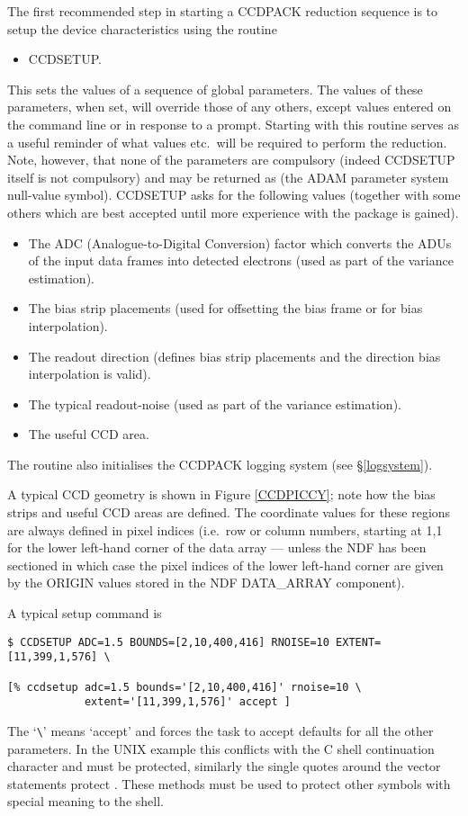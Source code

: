 The first recommended step in starting a CCDPACK reduction sequence is
to setup the device characteristics using the routine
\begin{itemize}
\item CCDSETUP.
\end{itemize}
This sets the values of a sequence of global parameters. The
values of these parameters, when set, will override those of any others,
except values entered on the command line or in response to a prompt.
Starting with this routine serves as a useful reminder of what values
etc.\ will be required to perform the reduction. Note, however, that
none of the parameters are compulsory (indeed CCDSETUP itself is not
compulsory) and may be returned as   (the ADAM parameter
system null-value symbol).  CCDSETUP asks for the following values
(together with some others which are  best accepted until more
experience with the package is gained). 

\begin{itemize}
\item The ADC (Analogue-to-Digital Conversion) factor which converts the
ADUs of the input data frames into detected electrons (used as part of
the variance estimation).
\item The bias strip placements (used for offsetting the bias frame or for
bias interpolation).
\item The readout direction (defines bias strip placements and the direction 
bias interpolation is valid).
\item The typical readout-noise (used as part of the variance
estimation).
\item The useful CCD area.
\end{itemize}
The routine also initialises the CCDPACK logging system (see
\S\ref{logsystem}).

A typical CCD geometry is shown in Figure \ref{CCDPICCY}; note how the
bias strips and useful CCD areas are defined. The coordinate values for
these regions are always defined in pixel indices (i.e.\ row or column
numbers, starting at 1,1 for the lower left-hand corner of the data array
--- unless the NDF has been sectioned in which case the pixel indices of
the lower left-hand corner are given by the ORIGIN values stored in the
NDF DATA\_ARRAY component).

A typical setup command is
\begin{myquote}
\begin{verbatim}
$ CCDSETUP ADC=1.5 BOUNDS=[2,10,400,416] RNOISE=10 EXTENT=[11,399,1,576] \

[% ccdsetup adc=1.5 bounds='[2,10,400,416]' rnoise=10 \
            extent='[11,399,1,576]' accept ]

\end{verbatim}
\end{myquote}
The `{\small \verb+\+}' means `accept' and forces the task to accept
defaults for all the other parameters. In the UNIX example this
conflicts with the C shell continuation character and must be protected,
similarly the single quotes around the vector statements protect
\myverb{[ ]}. These methods must be used to protect other symbols with
special meaning to the shell. 

